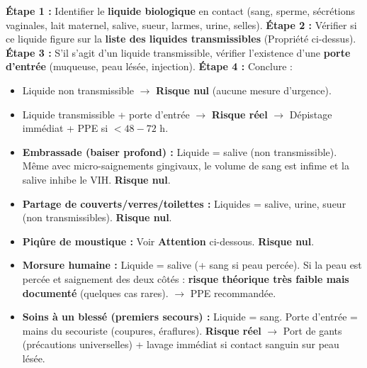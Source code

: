 \documentclass[11pt]{article}
\begin{document}
\begin{methode}
\textbf{Étape 1 :} Identifier le \textbf{liquide biologique} en contact (sang, sperme, sécrétions vaginales, lait maternel, salive, sueur, larmes, urine, selles).
\textbf{Étape 2 :} Vérifier si ce liquide figure sur la \textbf{liste des liquides transmissibles} (Propriété ci-dessus).
\textbf{Étape 3 :} S'il s'agit d'un liquide transmissible, vérifier l'existence d'une \textbf{porte d'entrée} (muqueuse, peau lésée, injection).
\textbf{Étape 4 :} Conclure :
\begin{itemize}
    \item Liquide non transmissible $\rightarrow$ \textbf{Risque nul} (aucune mesure d'urgence).
    \item Liquide transmissible + porte d'entrée $\rightarrow$ \textbf{Risque réel} $\rightarrow$ Dépistage immédiat + PPE si $< 48-72$ h.
\end{itemize}
\end{methode}

\begin{exemplebox}
\begin{itemize}
    \item \textbf{Embrassade (baiser profond) :} Liquide = salive (non transmissible). Même avec micro-saignements gingivaux, le volume de sang est infime et la salive inhibe le VIH. \textbf{Risque nul}.
    \item \textbf{Partage de couverts/verres/toilettes :} Liquides = salive, urine, sueur (non transmissibles). \textbf{Risque nul}.
    \item \textbf{Piqûre de moustique :} Voir \textbf{Attention} ci-dessous. \textbf{Risque nul}.
    \item \textbf{Morsure humaine :} Liquide = salive (+ sang si peau percée). Si la peau est percée et saignement des deux côtés : \textbf{risque théorique très faible mais documenté} (quelques cas rares). $\rightarrow$ PPE recommandée.
    \item \textbf{Soins à un blessé (premiers secours) :} Liquide = sang. Porte d'entrée = mains du secouriste (coupures, éraflures). \textbf{Risque réel} $\rightarrow$ Port de gants (précautions universelles) + lavage immédiat si contact sanguin sur peau lésée.
\end{itemize}
\end{exemplebox}
\end{document}
